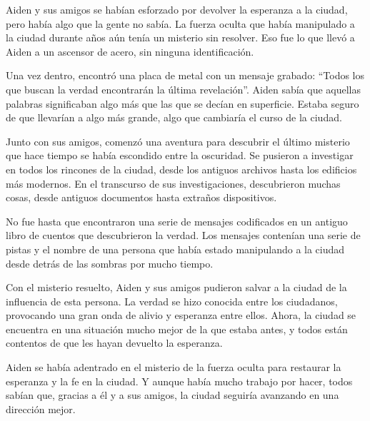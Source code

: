

Aiden y sus amigos se habían esforzado por devolver la esperanza a la ciudad, pero había algo que la gente no sabía. La fuerza oculta que había manipulado a la ciudad durante años aún tenía un misterio sin resolver. Eso fue lo que llevó a Aiden a un ascensor de acero, sin ninguna identificación. 

Una vez dentro, encontró una placa de metal con un mensaje grabado: “Todos los que buscan la verdad encontrarán la última revelación”. Aiden sabía que aquellas palabras significaban algo más que las que se decían en superficie. Estaba seguro de que llevarían a algo más grande, algo que cambiaría el curso de la ciudad. 

Junto con sus amigos, comenzó una aventura para descubrir el último misterio que hace tiempo se había escondido entre la oscuridad. Se pusieron a investigar en todos los rincones de la ciudad, desde los antiguos archivos hasta los edificios más modernos. En el transcurso de sus investigaciones, descubrieron muchas cosas, desde antiguos documentos hasta extraños dispositivos.

No fue hasta que encontraron una serie de mensajes codificados en un antiguo libro de cuentos que descubrieron la verdad. Los mensajes contenían una serie de pistas y el nombre de una persona que había estado manipulando a la ciudad desde detrás de las sombras por mucho tiempo. 

Con el misterio resuelto, Aiden y sus amigos pudieron salvar a la ciudad de la influencia de esta persona. La verdad se hizo conocida entre los ciudadanos, provocando una gran onda de alivio y esperanza entre ellos. Ahora, la ciudad se encuentra en una situación mucho mejor de la que estaba antes, y todos están contentos de que les hayan devuelto la esperanza. 

Aiden se había adentrado en el misterio de la fuerza oculta para restaurar la esperanza y la fe en la ciudad. Y aunque había mucho trabajo por hacer, todos sabían que, gracias a él y a sus amigos, la ciudad seguiría avanzando en una dirección mejor.